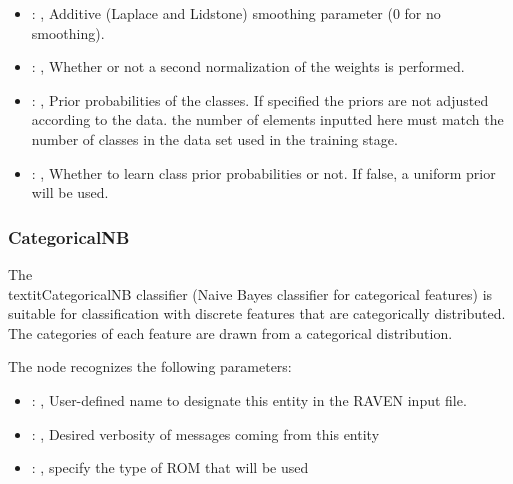 \begin{itemize}
    \item {}: , 
      Additive (Laplace and Lidstone) smoothing parameter (0 for no smoothing).

    \item {}: , 
      Whether or not a second normalization of the weights is performed.

    \item {}: , 
      Prior probabilities of the classes. If specified the priors are
      not adjusted according to the data. \nb the number of elements inputted here must
      match the number of classes in the data set used in the training stage.

    \item {}: , 
      Whether to learn class prior probabilities or not. If false, a uniform
      prior will be used.
  \end{itemize}


\subsubsection{CategoricalNB}
  The \\textit{CategoricalNB} classifier (Naive Bayes classifier for categorical features)
  is suitable for classification with discrete features that are categorically distributed.
  The categories of each feature are drawn from a categorical distribution.

  The  node recognizes the following parameters:
    \begin{itemize}
      \item {}: , 
        User-defined name to designate this entity in the RAVEN input file.
      \item {}: , 
        Desired verbosity of messages coming from this entity
      \item {}: , 
        specify the type of ROM that will be used
  \end{itemize}

